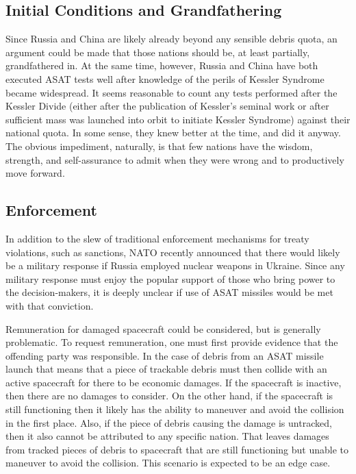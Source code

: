 \subsection{Initial Conditions and Grandfathering}
Since Russia and China are likely already beyond any sensible debris quota, an argument could be made that those nations should be, at least partially, grandfathered in.  At the same time, however, Russia and China have both executed ASAT tests well after knowledge of the perils of Kessler Syndrome became widespread.  It seems reasonable to count any tests performed after the Kessler Divide (either after the publication of Kessler's seminal work or after sufficient mass was launched into orbit to initiate Kessler Syndrome) against their national quota.  In some sense, they knew better at the time, and did it anyway.  The obvious impediment, naturally, is that few nations have the wisdom, strength, and self-assurance to admit when they were wrong and to productively move forward.

\subsection{Enforcement}
In addition to the slew of traditional enforcement mechanisms for treaty violations, such as sanctions, NATO recently announced that there would likely be a military response if Russia employed nuclear weapons in Ukraine.  Since any military response must enjoy the popular support of those who bring power to the decision-makers, it is deeply unclear if use of ASAT missiles would be met with that conviction.

Remuneration for damaged spacecraft could be considered, but is generally problematic.  To request remuneration, one must first provide evidence that the offending party was responsible.  In the case of debris from an ASAT missile launch that means that a piece of trackable debris must then collide with an active spacecraft for there to be economic damages.  If the spacecraft is inactive, then there are no damages to consider.  On the other hand, if the spacecraft is still functioning then it likely has the ability to maneuver and avoid the collision in the first place.  Also, if the piece of debris causing the damage is untracked, then it also cannot be attributed to any specific nation.  That leaves damages from tracked pieces of debris to spacecraft that are still functioning but unable to maneuver to avoid the collision.  This scenario is expected to be an edge case.

